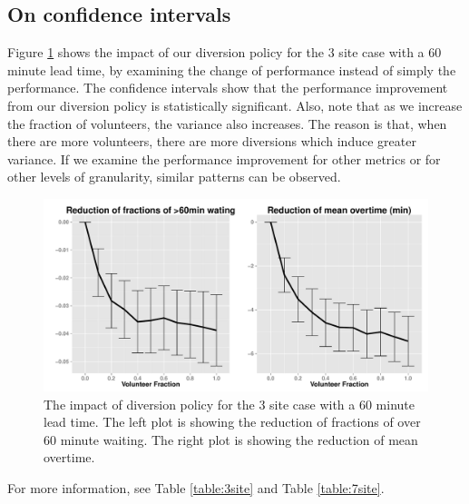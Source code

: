\subsection{On confidence intervals}

Figure \ref{fig:ci} shows the impact of our diversion policy
for the 3 site case with a 60 minute lead time, by examining the
change of performance instead of simply the performance.
The confidence intervals show that the performance improvement
from our diversion policy is statistically
significant. Also, note that as we increase the fraction of
volunteers, the variance also increases. The reason is that,
when there are more volunteers, there are more diversions which
induce greater variance. If we examine the performance improvement
for other metrics or for other levels of granularity, similar patterns
can be observed.

\begin{figure}[htp]
\centering
\includegraphics[width=.95\textwidth]{chap3/numeric/pic/ci}
\caption{The impact of diversion policy for the 3 site case
with a 60 minute lead time. The left plot is showing the
reduction of fractions of over 60 minute waiting. The right plot
is showing the reduction of mean overtime.}
\label{fig:ci}
\end{figure}

For more information, see Table
\ref{table:3site} and Table \ref{table:7site}.


